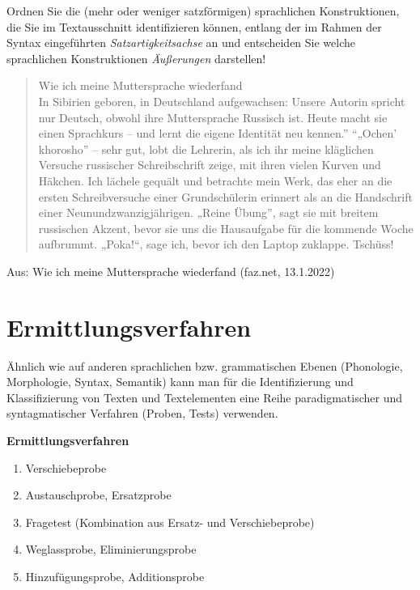 \documentclass[
  letterpaper,
  DIV=11,
  numbers=noendperiod]{scrreprt}
\providecommand{\tightlist}{%
  \setlength{\itemsep}{0pt}\setlength{\parskip}{0pt}}\usepackage{longtable,booktabs,array}
\begin{document}
Ordnen Sie die (mehr oder weniger satzförmigen) sprachlichen
Konstruktionen, die Sie im Textausschnitt identifizieren können, entlang
der im Rahmen der Syntax eingeführten \emph{Satzartigkeitsachse} an und
entscheiden Sie welche sprachlichen Konstruktionen \emph{Äußerungen}
darstellen!

\begin{quote}
Wie ich meine Muttersprache wiederfand\\
In Sibirien geboren, in Deutschland aufgewachsen: Unsere Autorin spricht
nur Deutsch, obwohl ihre Muttersprache Russisch ist. Heute macht sie
einen Sprachkurs -- und lernt die eigene Identität neu kennen.''
``„Ochen' khorosho'' -- sehr gut, lobt die Lehrerin, als ich ihr meine
kläglichen Versuche russischer Schreibschrift zeige, mit ihren vielen
Kurven und Häkchen. Ich lächele gequält und betrachte mein Werk, das
eher an die ersten Schreibversuche einer Grundschülerin erinnert als an
die Handschrift einer Neunundzwanzigjährigen. „Reine Übung'', sagt sie
mit breitem russischen Akzent, bevor sie uns die Hausaufgabe für die
kommende Woche aufbrummt. „Poka!{}``, sage ich, bevor ich den Laptop
zuklappe. Tschüss!
\end{quote}

Aus: Wie ich meine Muttersprache wiederfand (faz.net, 13.1.2022)

\hypertarget{ermittlungsverfahren}{%
\section{Ermittlungsverfahren}\label{ermittlungsverfahren}}

Ähnlich wie auf anderen sprachlichen bzw. grammatischen Ebenen
(Phonologie, Morphologie, Syntax, Semantik) kann man für die
Identifizierung und Klassifizierung von Texten und Textelementen eine
Reihe paradigmatischer und syntagmatischer Verfahren (Proben, Tests)
verwenden.

\textbf{Ermittlungsverfahren}

\begin{enumerate}
\def\labelenumi{\arabic{enumi}.}
\tightlist
\item
  Verschiebeprobe\\
\item
  Austauschprobe, Ersatzprobe\\
\item
  Fragetest (Kombination aus Ersatz- und Verschiebeprobe)\\
\item
  Weglassprobe, Eliminierungsprobe\\
\item
  Hinzufügungsprobe, Additionsprobe\\
\end{enumerate}
\end{document}
